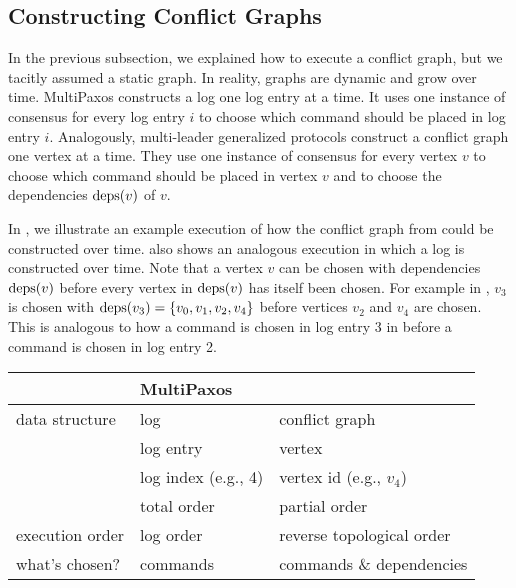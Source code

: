 \subsection{Constructing Conflict Graphs}
In the previous subsection, we explained how to execute a conflict graph, but
we tacitly assumed a static graph. In reality, graphs are dynamic and grow over
time. MultiPaxos constructs a log one log entry at a time. It uses one instance
of consensus for every log entry $i$ to choose which command should be placed
in log entry $i$. Analogously, multi-leader generalized protocols construct a
conflict graph one vertex at a time. They use one instance of consensus for
every vertex $v$ to choose which command should be placed in vertex $v$ and to
choose the dependencies $\text{deps}(v)$ of $v$.

In , we illustrate an example execution of how
the conflict graph from  could be constructed over time.
 also shows an analogous execution in which a log
is constructed over time. Note that a vertex $v$ can be chosen with
dependencies $\text{deps}(v)$ before every vertex in $\text{deps}(v)$ has itself been
chosen. For example in , $v_3$ is chosen with $\text{deps}(v_3) =
\{v_0, v_1, v_2, v_4\}$ before vertices $v_2$ and $v_4$ are chosen. This is
analogous to how a command is chosen in log entry 3 in  before a
command is chosen in log entry 2.

{}

\begin{table}
  \begin{tabular}{lll}
    \toprule
                    & MultiPaxos          & \BipartisanPaxos{} \\\midrule
    data structure  & log                 & conflict graph \\
                    & log entry           & vertex \\
                    & log index (e.g., 4) & vertex id (e.g., $v_4$) \\
                    & total order         & partial order \\
    execution order & log order           & reverse topological order \\
    what's chosen?  & commands            & commands \& dependencies \\
    \bottomrule
  \end{tabular}
\end{table}

